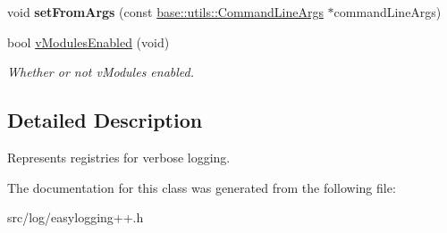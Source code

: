 \begin{DoxyCompactItemize}
\item 
void {\bfseries set\+From\+Args} (const \hyperlink{classel_1_1base_1_1utils_1_1CommandLineArgs}{base\+::utils\+::\+Command\+Line\+Args} $\ast$command\+Line\+Args)\hypertarget{classel_1_1base_1_1VRegistry_a811e62d7d016a0714b4363f47216a9da}{}\label{classel_1_1base_1_1VRegistry_a811e62d7d016a0714b4363f47216a9da}

\item 
bool \hyperlink{classel_1_1base_1_1VRegistry_ad7a8e939daf6b3d6b949def0a9f65a1f}{v\+Modules\+Enabled} (void)\hypertarget{classel_1_1base_1_1VRegistry_ad7a8e939daf6b3d6b949def0a9f65a1f}{}\label{classel_1_1base_1_1VRegistry_ad7a8e939daf6b3d6b949def0a9f65a1f}

\begin{DoxyCompactList}\small\item\em Whether or not v\+Modules enabled. \end{DoxyCompactList}\end{DoxyCompactItemize}


\subsection{Detailed Description}
Represents registries for verbose logging. 

The documentation for this class was generated from the following file\+:\begin{DoxyCompactItemize}
\item 
src/log/easylogging++.\+h\end{DoxyCompactItemize}
